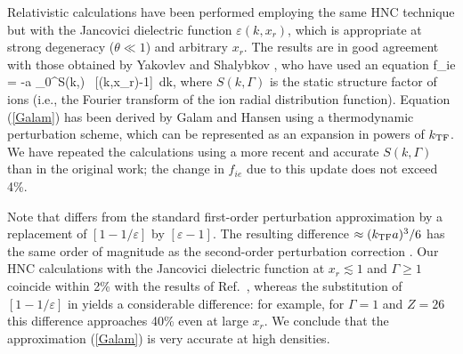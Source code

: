 Relativistic calculations have been performed
employing the same HNC technique but with the Jancovici \cite{Janco}
dielectric function $\varepsilon(k,x_r)$,
which is appropriate at strong degeneracy ($\theta\ll1$) 
and arbitrary $x_r$. 
The results are in good agreement
with those obtained by Yakovlev and Shalybkov \cite{YS},
who have used an equation
\beq
   f_{ie}
       = -{\Gamma a\over\pi} \int_0^\infty S(k,\Gamma) 
     \, [\varepsilon(k,x_r)-1]\, dk,
\label{Galam}
\eeq
where $S(k,\Gamma)$ is the static structure factor of ions
(i.e., the Fourier transform
of the ion radial distribution function).
Equation (\ref{Galam})
has been derived by Galam and Hansen \cite{GalamHansen}
using a thermodynamic perturbation
scheme, which can be represented as an expansion
in powers of $k_{\rm TF}$.
We have repeated the calculations \cite{YS}
using a more recent and accurate $S(k,\Gamma)$ \cite{YCD} than in the
original work; the change in $f_{ie}$
due to this update does not exceed 4\%.

Note that  differs from the standard
first-order perturbation approximation by a replacement
of $[1-1/\varepsilon]$ by $[\varepsilon-1]$. 
The resulting difference $\approx (k_{\rm TF}a)^3/6$
has the same order of magnitude as the second-order 
perturbation correction \cite{GalamHansen}.
Our HNC calculations with the Jancovici dielectric function
at $x_r\lesssim1$ and $\Gamma\geq1$ 
coincide within 2\%
with the results of Ref.\ \cite{YS}, 
whereas the substitution of $[1-1/\varepsilon]$ in 
yields a considerable difference:
for example, for $\Gamma=1$ and $Z=26$ this difference
approaches 40\% even at large $x_r$.
We conclude that the approximation (\ref{Galam}) 
is very accurate at high densities.

